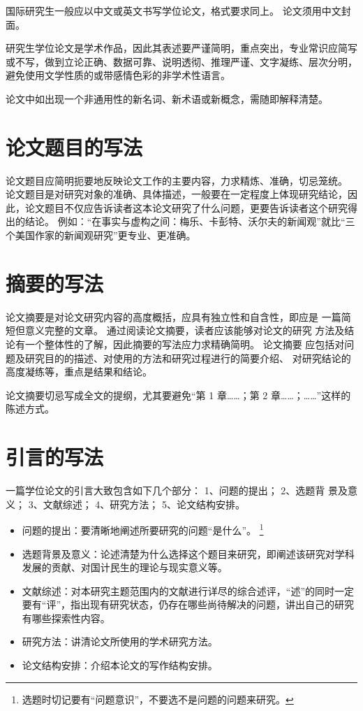 国际研究生一般应以中文或英文书写学位论文，格式要求同上。
论文须用中文封面。

研究生学位论文是学术作品，因此其表述要严谨简明，重点突出，专业常识应简写或不写，做到立论正确、数据可靠、说明透彻、推理严谨、文字凝练、层次分明，避免使用文学性质的或带感情色彩的非学术性语言。

论文中如出现一个非通用性的新名词、新术语或新概念，需随即解释清楚。


\section{论文题目的写法}

论文题目应简明扼要地反映论文工作的主要内容，力求精炼、准确，切忌笼统。
论文题目是对研究对象的准确、具体描述，一般要在一定程度上体现研究结论，因此，论文题目不仅应告诉读者这本论文研究了什么问题，更要告诉读者这个研究得出的结论。
例如：“在事实与虚构之间：梅乐、卡彭特、沃尔夫的新闻观”就比“三个美国作家的新闻观研究”更专业、更准确。



\section{摘要的写法}

论文摘要是对论文研究内容的高度概括，应具有独立性和自含性，即应是 一篇简短但意义完整的文章。
通过阅读论文摘要，读者应该能够对论文的研究 方法及结论有一个整体性的了解，因此摘要的写法应力求精确简明。
论文摘要 应包括对问题及研究目的的描述、对使用的方法和研究过程进行的简要介绍、 对研究结论的高度凝练等，重点是结果和结论。

论文摘要切忌写成全文的提纲，尤其要避免“第 1 章……；第 2 章……；……”这样的陈述方式。

\section{引言的写法}

一篇学位论文的引言大致包含如下几个部分：
1、问题的提出；
2、选题背 景及意义；
3、文献综述；
4、研究方法；
5、论文结构安排。
\begin{itemize}
  \item 问题的提出：要清晰地阐述所要研究的问题“是什么”。
    \footnote{选题时切记要有“问题意识”，不要选不是问题的问题来研究。}
  \item 选题背景及意义：论述清楚为什么选择这个题目来研究，即阐述该研究对学科发展的贡献、对国计民生的理论与现实意义等。
  \item 文献综述：对本研究主题范围内的文献进行详尽的综合述评，“述”的同时一定要有“评”，指出现有研究状态，仍存在哪些尚待解决的问题，讲出自己的研究有哪些探索性内容。
  \item 研究方法：讲清论文所使用的学术研究方法。
  \item 论文结构安排：介绍本论文的写作结构安排。
\end{itemize}



